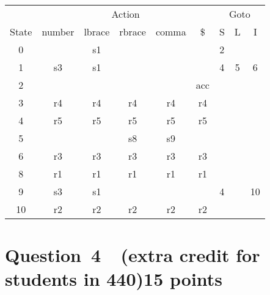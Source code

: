 \documentclass[10pt]{article}
\begin{document}
\begin{table}[h]
  \centering
  \begin{tabular}{c|ccccc|ccc}
    \toprule
          & \multicolumn{5}{c|}{Action} & \multicolumn{3}{c}{Goto}                                     \\
    State & number                      & lbrace                   & rbrace & comma & \$  & S & L & I  \\
    \midrule
    0     &                             & s1                       &        &       &     & 2 &   &    \\
    1     & s3                          & s1                       &        &       &     & 4 & 5 & 6  \\
    2     &                             &                          &        &       & acc &   &   &    \\
    3     & r4                          & r4                       & r4     & r4    & r4  &   &   &    \\
    4     & r5                          & r5                       & r5     & r5    & r5  &   &   &    \\
    5     &                             &                          & s8     & s9    &     &   &   &    \\
    6     & r3                          & r3                       & r3     & r3    & r3  &   &   &    \\
    8     & r1                          & r1                       & r1     & r1    & r1  &   &   &    \\
    9     & s3                          & s1                       &        &       &     & 4 &   & 10 \\
    10    & r2                          & r2                       & r2     & r2    & r2  &   &   &    \\
    \bottomrule
  \end{tabular}
\end{table}


\section*{Question~4~~(extra credit for students in 440)\hfill 15 points}
\end{document}
